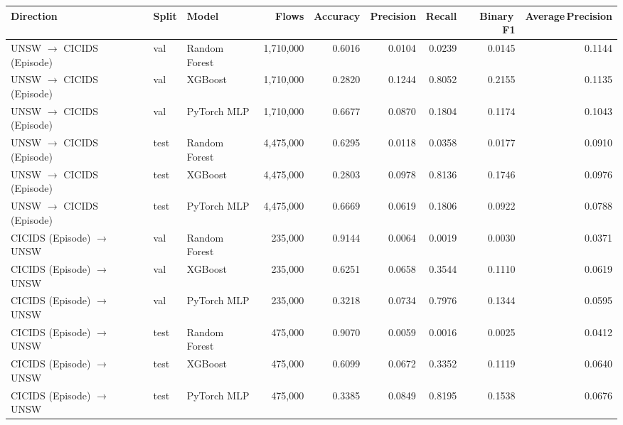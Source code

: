 \begin{tabular}{lllrrrrrr}
  \toprule
  Direction & Split & Model & Flows & Accuracy & Precision & Recall & Binary\,F1 & Average\,Precision \\
  \midrule
  UNSW $\to$ CICIDS (Episode) & val & Random Forest & 1,710,000 & 0.6016 & 0.0104 & 0.0239 & 0.0145 & 0.1144 \\
  UNSW $\to$ CICIDS (Episode) & val & XGBoost & 1,710,000 & 0.2820 & 0.1244 & 0.8052 & 0.2155 & 0.1135 \\
  UNSW $\to$ CICIDS (Episode) & val & PyTorch MLP & 1,710,000 & 0.6677 & 0.0870 & 0.1804 & 0.1174 & 0.1043 \\
  UNSW $\to$ CICIDS (Episode) & test & Random Forest & 4,475,000 & 0.6295 & 0.0118 & 0.0358 & 0.0177 & 0.0910 \\
  UNSW $\to$ CICIDS (Episode) & test & XGBoost & 4,475,000 & 0.2803 & 0.0978 & 0.8136 & 0.1746 & 0.0976 \\
  UNSW $\to$ CICIDS (Episode) & test & PyTorch MLP & 4,475,000 & 0.6669 & 0.0619 & 0.1806 & 0.0922 & 0.0788 \\
  CICIDS (Episode) $\to$ UNSW & val & Random Forest & 235,000 & 0.9144 & 0.0064 & 0.0019 & 0.0030 & 0.0371 \\
  CICIDS (Episode) $\to$ UNSW & val & XGBoost & 235,000 & 0.6251 & 0.0658 & 0.3544 & 0.1110 & 0.0619 \\
  CICIDS (Episode) $\to$ UNSW & val & PyTorch MLP & 235,000 & 0.3218 & 0.0734 & 0.7976 & 0.1344 & 0.0595 \\
  CICIDS (Episode) $\to$ UNSW & test & Random Forest & 475,000 & 0.9070 & 0.0059 & 0.0016 & 0.0025 & 0.0412 \\
  CICIDS (Episode) $\to$ UNSW & test & XGBoost & 475,000 & 0.6099 & 0.0672 & 0.3352 & 0.1119 & 0.0640 \\
  CICIDS (Episode) $\to$ UNSW & test & PyTorch MLP & 475,000 & 0.3385 & 0.0849 & 0.8195 & 0.1538 & 0.0676 \\
  \bottomrule
\end{tabular}
